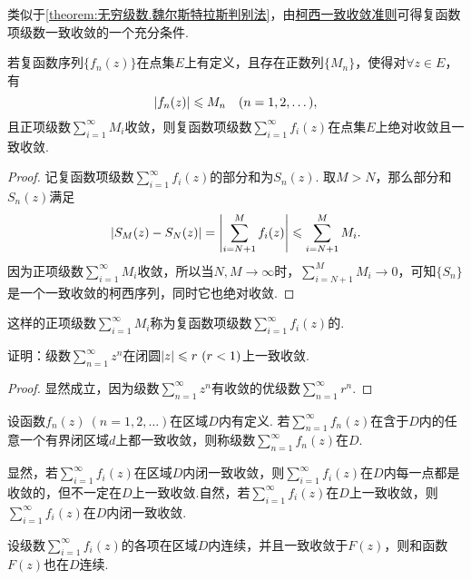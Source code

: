 类似于\cref{theorem:无穷级数.魏尔斯特拉斯判别法}，由\hyperref[theorem:无穷级数.柯西一致收敛准则]{柯西一致收敛准则}可得复函数项级数一致收敛的一个充分条件.
\begin{corollary}\label{theorem:无穷级数.优级数准则}
若复函数序列\(\{f_n(z)\}\)在点集\(E\)上有定义，且存在正数列\(\{M_n\}\)，使得对\(\forall z \in E\)，有\[
\abs{f_n(z)} \leqslant M_n
\quad(n=1,2,\dotsc),
\]且正项级数\(\sum\limits_{i=1}^{\infty} M_i\)收敛，则复函数项级数\(\sum\limits_{i=1}^{\infty} f_i(z)\)在点集\(E\)上绝对收敛且一致收敛.
\begin{proof}
记复函数项级数\(\sum\limits_{i=1}^{\infty} f_i(z)\)的部分和为\(S_n(z)\).
取\(M > N\)，那么部分和\(S_n(z)\)满足\[
\abs{S_M(z) - S_N(z)}
= \abs{\sum\limits_{i=N+1}^M f_i(z)}
\leqslant \sum\limits_{i=N+1}^M M_i.
\]因为正项级数\(\sum\limits_{i=1}^{\infty} M_i\)收敛，所以当\(N,M \to \infty\)时，\(\sum\limits_{i=N+1}^M M_i \to 0\)，可知\(\{S_n\}\)是一个一致收敛的柯西序列，同时它也绝对收敛.
\end{proof}
\end{corollary}
这样的正项级数\(\sum\limits_{i=1}^{\infty} M_i\)称为复函数项级数\(\sum\limits_{i=1}^{\infty} f_i(z)\)的.

\begin{example}
证明：级数\(\sum\limits_{n=1}^{\infty} z^n\)在闭圆\(\abs{z} \leqslant r\ (r<1)\)上一致收敛.
\begin{proof}
显然成立，因为级数\(\sum\limits_{n=1}^{\infty} z^n\)有收敛的优级数\(\sum\limits_{n=1}^{\infty} r^n\).
\end{proof}
\end{example}

\begin{definition}
设函数\(f_n(z)\ (n=1,2,\dots)\)在区域\(D\)内有定义.
若\(\sum\limits_{n=1}^{\infty} f_n(z)\)在含于\(D\)内的任意一个有界闭区域\(d\)上都一致收敛，则称级数\(\sum\limits_{n=1}^{\infty} f_n(z)\)在\(D\).
\end{definition}
显然，若\(\sum\limits_{i=1}^{\infty} f_i(z)\)在区域\(D\)内闭一致收敛，则\(\sum\limits_{i=1}^{\infty} f_i(z)\)在\(D\)内每一点都是收敛的，但不一定在\(D\)上一致收敛.自然，若\(\sum\limits_{i=1}^{\infty} f_i(z)\)在\(D\)上一致收敛，则\(\sum\limits_{i=1}^{\infty} f_i(z)\)在\(D\)内闭一致收敛.

\begin{theorem}\label{theorem:解析函数的级数表示.一致收敛级数的基本性质1}
设级数\(\sum\limits_{i=1}^{\infty} f_i(z)\)的各项在区域\(D\)内连续，并且一致收敛于\(F(z)\)，则和函数\(F(z)\)也在\(D\)连续.
\end{theorem}

